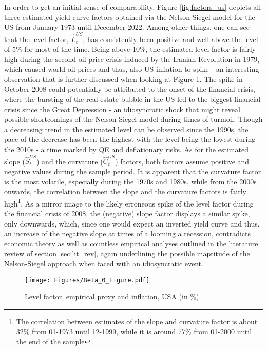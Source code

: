 In order to get an initial sense of comparability, Figure \ref{fig:factors_us} depicts all three estimated yield curve factors obtained via the Nelson-Siegel model for the US from January 1973 until December 2022.
Among other things, one can see that the level factor, $\hat{L}^{US}_{t}$, has consistently been positive and well above the level of 5\% for most of the time. 
Being above 10\%, the estimated level factor is fairly high during the second oil price crisis induced by the Iranian Revolution in 1979, which caused world oil prices and thus, also US inflation to spike - an interesting observation that is further discussed when looking at Figure \ref{fig:level_factor_us}. 
The spike in October 2008 could potentially be attributed to the onset of the financial crisis, where the bursting of the real estate bubble in the US led to the biggest financial crisis since the Great Depression - an idiosyncratic shock that might reveal possible shortcomings of the Nelson-Siegel model during times of turmoil. 
Though a decreasing trend in the estimated level can be observed since the 1990s, the pace of the decrease has been the highest with the level being the lowest during the 2010s - a time marked by QE and deflationary risks. 
As for the estimated slope ($\hat{S}^{US}_{t}$) and the curvature ($\hat{C}^{US}_{t}$) factors, both factors assume positive and negative values during the sample period. 
It is apparent that the curvature factor is the most volatile, especially during the 1970s and 1980s, while from the 2000s onwards, the correlation between the slope and the curvature factors is fairly high\footnote{The correlation between estimates of the slope and curvature factor is about 32\% from 01-1973 until 12-1999, while it is around 77\% from 01-2000 until the end of the sample}. 
As a mirror image to the likely erroneous spike of the level factor during the financial crisis of 2008, the (negative) slope factor displays a similar spike, only downwards, which, since one would expect an inverted yield curve and thus, an increase of the negative slope at times of a looming a recession, contradicts economic theory as well as countless empirical analyses outlined in the literature review of section \ref{sec:lit_rev}, again underlining the possible inaptitude of the Nelson-Siegel approach when faced with an idiosyncratic event.  

\begin{figure}[!t]
    \centering
    \texttt{[image: Figures/Beta\_0\_Figure.pdf]}
    \caption{Level factor, empirical proxy and inflation, USA (in \%)}
    \label{fig:level_factor_us}
\end{figure}

